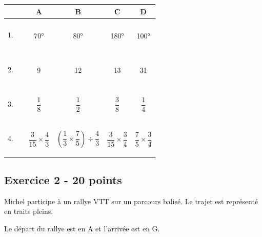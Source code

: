 \begin{multicols}{2}
    \begin{center} \begin{tabular}{|c|c|c|c|c|}  \hline
        & A & B & C & D \\ \hline
        1. $\phantom{\dfrac{\dfrac{1}{1}}{\dfrac{1}{1}}}$  & 70° & 80° & 180° & 100° \\ \hline
        2. $\phantom{\dfrac{\dfrac{1}{1}}{\dfrac{1}{1}}}$  &   9 &  12 &   13 & 31   \\ \hline
        3. $\phantom{\dfrac{\dfrac{1}{1}}{\dfrac{1}{1}}}$  & $\dfrac{1}{8}$ & $\dfrac{1}{2}$ & $\dfrac{3}{8}$ & $\dfrac{1}{4} $ \\ \hline
        4. $\phantom{\dfrac{\dfrac{1}{1}}{\dfrac{1}{1}}}$  & $\dfrac{3}{15} \times \dfrac{4}{3}$ & $\left(\dfrac{1}{3} \times \dfrac{7}{5} \right) \div \dfrac{4}{3}$ & $\dfrac{3}{15} \times \dfrac{3}{4}$ & $\dfrac{7}{5} \times \dfrac{3}{4} $  \\ \hline
    \end{tabular} \end{center}

\end{multicols}

\medskip

\subsection*{Exercice 2 - 20 points}

\medskip

Michel participe à un rallye VTT sur un parcours balisé. Le trajet est représenté en traits pleins.

Le départ du rallye est en A et l'arrivée est en G.

